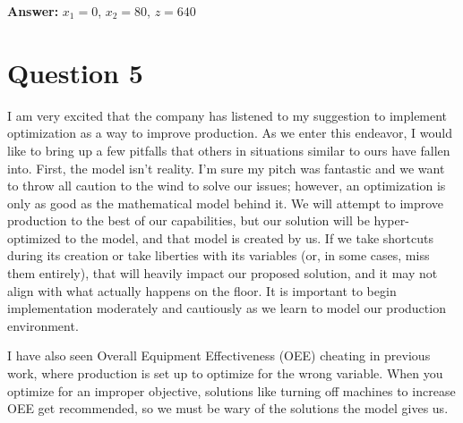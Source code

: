 \documentclass{article}
\begin{document}
\textbf{Answer:} $x_1 = 0$, $x_2 = 80$, $z = 640$

\section*{Question 5}
I am very excited that the company has listened to my suggestion to implement optimization as a way to improve production. As we enter this endeavor, I would like to bring up a few pitfalls that others in situations similar to ours have fallen into. First, the model isn't reality. I'm sure my pitch was fantastic and we want to throw all caution to the wind to solve our issues; however, an optimization is only as good as the mathematical model behind it. We will attempt to improve production to the best of our capabilities, but our solution will be hyper-optimized to the model, and that model is created by us. If we take shortcuts during its creation or take liberties with its variables (or, in some cases, miss them entirely), that will heavily impact our proposed solution, and it may not align with what actually happens on the floor. It is important to begin implementation moderately and cautiously as we learn to model our production environment.

I have also seen Overall Equipment Effectiveness (OEE) cheating in previous work, where production is set up to optimize for the wrong variable. When you optimize for an improper objective, solutions like turning off machines to increase OEE get recommended, so we must be wary of the solutions the model gives us.
\end{document}
